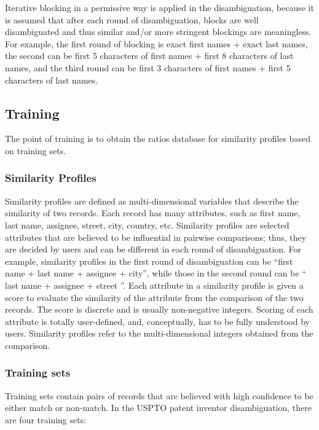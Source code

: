 \documentclass{article}
\begin{document}
Iterative blocking in a permissive way is applied in the
disambiguation, because it is assumed that after each round
of disambiguation, blocks are well disambiguated and thus
similar and/or more stringent blockings are meaningless.
For example, the first round of blocking is exact
first names + exact last names, the second can
be first 5 characters of first names + first 8 characters
of last names, and the third round can be first
3 characters of first names + first 5 characters of last names.


\subsection{Training}

The point of training is to obtain the ratios database for
similarity profiles based on training sets.

\subsubsection{Similarity Profiles}

Similarity profiles are defined as multi-dimensional variables
that describe the similarity of two records. Each record has
many attributes, such as first name, last name, assignee, street,
city, country, etc. Similarity profiles are selected attributes
that are believed to be influential in pairwise comparisons; thus,
they are decided by users and can be different in each round of
disambiguation. For example, similarity profiles in the first round
of disambiguation can be “first name + last name + assignee +
city”, while those in the second round can be “ last name +
assignee + street ”. Each attribute in a similarity profile is
given a score to evaluate the similarity of the attribute from the
comparison of the two records. The score is discrete and is usually
non-negative integers. Scoring of each attribute is totally
user-defined, and, conceptually, has to be fully understood by users.
Similarity profiles refer to the multi-dimensional integers obtained
from the comparison.



\subsubsection{Training sets}

Training sets contain pairs of records that are believed
with high confidence to be either match or
non-match. In the USPTO patent inventor disambiguation,
there are four training sets:
\end{document}
